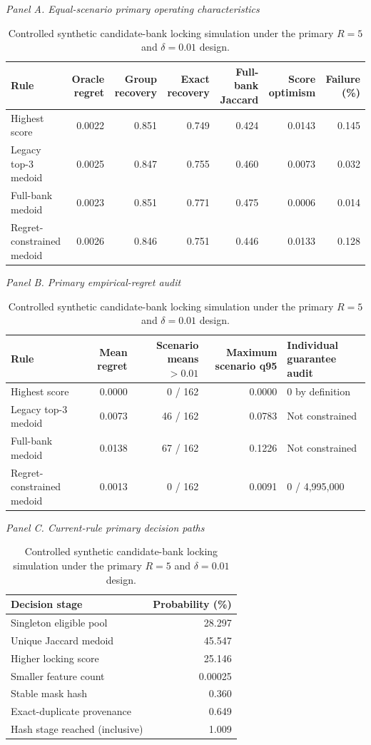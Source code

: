 \begin{table}[p]
\centering
\caption{Controlled synthetic candidate-bank locking simulation under the primary $R=5$ and $\delta=0.01$ design.}
\label{tab:supp25}
\scriptsize
\textit{Panel A. Equal-scenario primary operating characteristics}\par\smallskip
\setlength{\tabcolsep}{3.2pt}
\begin{tabular}{lrrrrrr}
\toprule
Rule & Oracle regret & Group recovery & Exact recovery & Full-bank Jaccard & Score optimism & Failure (\%) \\
\midrule
Highest score & 0.0022 & 0.851 & 0.749 & 0.424 & 0.0143 & 0.145 \\
Legacy top-3 medoid & 0.0025 & 0.847 & 0.755 & 0.460 & 0.0073 & 0.032 \\
Full-bank medoid & 0.0023 & 0.851 & 0.771 & 0.475 & 0.0006 & 0.014 \\
Regret-constrained medoid & 0.0026 & 0.846 & 0.751 & 0.446 & 0.0133 & 0.128 \\
\bottomrule
\end{tabular}

\medskip
\textit{Panel B. Primary empirical-regret audit}\par\smallskip
\setlength{\tabcolsep}{4.0pt}
\begin{tabular}{lrrrp{31mm}}
\toprule
Rule & Mean regret & Scenario means $>0.01$ & Maximum scenario q95 & Individual guarantee audit \\
\midrule
Highest score & 0.0000 & 0 / 162 & 0.0000 & 0 by definition \\
Legacy top-3 medoid & 0.0073 & 46 / 162 & 0.0783 & Not constrained \\
Full-bank medoid & 0.0138 & 67 / 162 & 0.1226 & Not constrained \\
Regret-constrained medoid & 0.0013 & 0 / 162 & 0.0091 & 0 / 4,995,000 \\
\bottomrule
\end{tabular}

\medskip
\textit{Panel C. Current-rule primary decision paths}\par\smallskip
\begin{tabular}{lr}
\toprule
Decision stage & Probability (\%) \\
\midrule
Singleton eligible pool & 28.297 \\
Unique Jaccard medoid & 45.547 \\
Higher locking score & 25.146 \\
Smaller feature count & 0.00025 \\
Stable mask hash & 0.360 \\
Exact-duplicate provenance & 0.649 \\
Hash stage reached (inclusive) & 1.009 \\
\bottomrule
\end{tabular}


\end{table}

